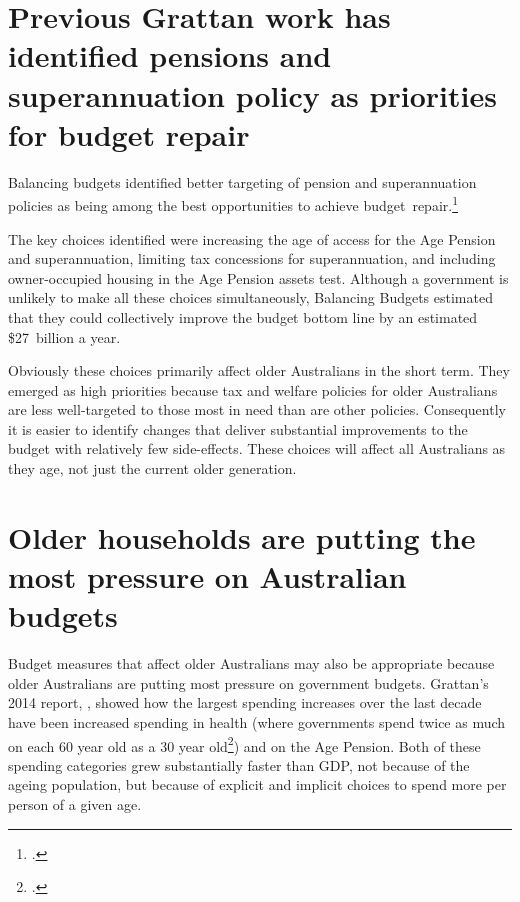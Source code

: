 \section{Previous Grattan work has identified pensions and superannuation policy as priorities for budget repair}\label{sec:SUPER-prev-grattan-work-identified-super}
Balancing budgets identified better targeting of pension and superannuation policies as being among the best opportunities to achieve budget~repair.\footcite[][29]{DaleyMcGannonSavage2013BudgetPressures}

The key choices identified were increasing the age of access for the Age Pension and superannuation, limiting tax concessions for superannuation, and including owner-occupied housing in the Age Pension assets test. Although a government is unlikely to make all these choices simultaneously, Balancing Budgets estimated that they could collectively improve the budget bottom line by an estimated \$27~billion a year.

Obviously these choices primarily affect older Australians in the short term. They emerged as high priorities because tax and welfare policies for older Australians are less well-targeted to those most in need than are other policies. Consequently it is easier to identify changes that deliver substantial improvements to the budget with relatively few side-effects. These choices will affect all Australians as they age, not just the current older generation. 

\section{Older households are putting the most pressure on Australian budgets}
Budget measures that affect older Australians may also be appropriate because older Australians are putting most pressure on government budgets. Grattan’s 2014 report, , showed how the largest spending increases over the last decade have been increased spending in health (where governments spend twice as much on each 60 year old as a 30 year old\footcite[][25]{DaleyMcGannonHunter2014}) and on the Age Pension. Both of these spending categories grew substantially faster than GDP, not because of the ageing population, but because of explicit and implicit choices to spend more per person of a given age.

